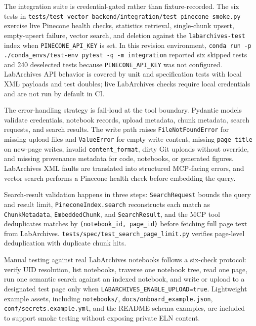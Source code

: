\documentclass{josr}
\begin{document}
The integration suite is credential-gated rather than fixture-recorded. The six tests in \texttt{tests/test\_vector\_backend/integration/test\_pinecone\_smoke.py} exercise live Pinecone health checks, statistics retrieval, single-chunk upsert, empty-upsert failure, vector search, and deletion against the \texttt{labarchives-test} index when \texttt{PINECONE\_API\_KEY} is set. In this revision environment, \texttt{conda run -p ./conda\_envs/test-env pytest -q -m integration} reported six skipped tests and 240 deselected tests because \texttt{PINECONE\_API\_KEY} was not configured. LabArchives API behavior is covered by unit and specification tests with local XML payloads and test doubles; live LabArchives checks require local credentials and are not run by default in CI.

The error-handling strategy is fail-loud at the tool boundary. Pydantic models validate credentials, notebook records, upload metadata, chunk metadata, search requests, and search results. The write path raises \texttt{FileNotFoundError} for missing upload files and \texttt{ValueError} for empty write content, missing \texttt{page\_title} on new-page writes, invalid \texttt{content\_format}, dirty Git uploads without override, and missing provenance metadata for code, notebooks, or generated figures. LabArchives XML faults are translated into structured MCP-facing errors, and vector search performs a Pinecone health check before embedding the query.

Search-result validation happens in three steps: \texttt{SearchRequest} bounds the query and result limit, \texttt{PineconeIndex.search} reconstructs each match as \texttt{ChunkMetadata}, \texttt{EmbeddedChunk}, and \texttt{SearchResult}, and the MCP tool deduplicates matches by \texttt{(notebook\_id, page\_id)} before fetching full page text from LabArchives. \texttt{tests/spec/test\_search\_page\_limit.py} verifies page-level deduplication with duplicate chunk hits.

Manual testing against real LabArchives notebooks follows a six-check protocol: verify UID resolution, list notebooks, traverse one notebook tree, read one page, run one semantic search against an indexed notebook, and write or upload to a designated test page only when \texttt{LABARCHIVES\_ENABLE\_UPLOAD=true}. Lightweight example assets, including \texttt{notebooks/}, \texttt{docs/onboard\_example.json}, \texttt{conf/secrets.example.yml}, and the README schema examples, are included to support smoke testing without exposing private ELN content.
\end{document}
